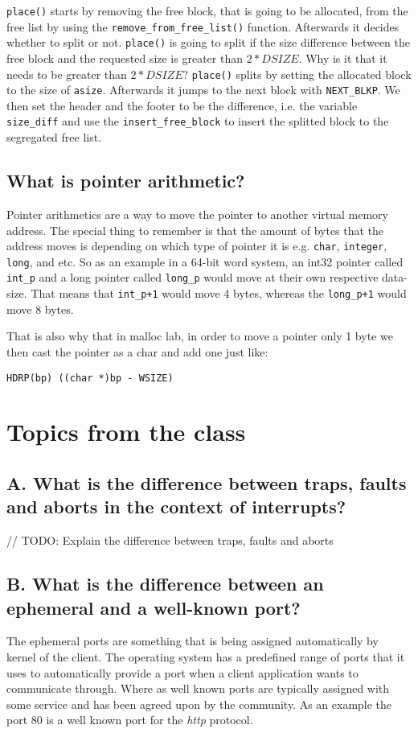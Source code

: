 \documentclass[11pt]{article}
\newcommand{\code}[1]{{\colorbox{lightgray!15}{\color{orange}\texttt{#1}}}}
\newcommand{\temp}[1]{{\color{red}#1}}
\begin{document}
\code{place()} starts by removing the free block, that is going to be allocated, from the free list by using the \code{remove\_from\_free\_list()} function. 
Afterwards it decides whether to split or not. \code{place()} is going to split if the size difference between the free block and the requested size is greater than $2 * DSIZE$.
\temp{Why is it that it needs to be greater than $2 * DSIZE$?}
\code{place()} splits by setting the allocated block to the size of \code{asize}. Afterwards it jumps to the next block with \code{NEXT\_BLKP}.
We then set the header and the footer to be the difference, i.e. the variable \code{size\_diff} and use the \code{insert\_free\_block} to insert the splitted block to the segregated free list.

\subsection{What is pointer arithmetic?}
Pointer arithmetics are a way to move the pointer to another virtual memory address. The special thing to remember is that the amount of bytes 
that the address moves is depending on which type of pointer it is e.g. \code{char}, \code{integer}, \code{long}, and etc.
So as an example in a 64-bit word system, an int32 pointer called \code{int\_p} and a long pointer called \code{long\_p} would move at their own respective data-size.
That means that \code{int\_p+1} would move 4 bytes, whereas the \code{long\_p+1} would move 8 bytes.

That is also why that in malloc lab, in order to move a pointer only 1 byte we then cast the pointer as a char and add one just like: 

\code{HDRP(bp) ((char *)bp - WSIZE)}

\section{Topics from the class}

\subsection{A. What is the difference between traps, faults and aborts in the context of interrupts?}

// TODO: Explain the difference between traps, faults and aborts

\subsection{B. What is the difference between an ephemeral and a well-known port?}
The ephemeral ports are something that is being assigned automatically by kernel of the client. The operating system has a predefined range of ports that it uses to automatically provide a port when a client application wants to communicate through. 
Where as well known ports are typically assigned with some service and has been 
agreed upon by the community. As an example the port 80 is a well known port for the \textit{http} protocol.
\end{document}
